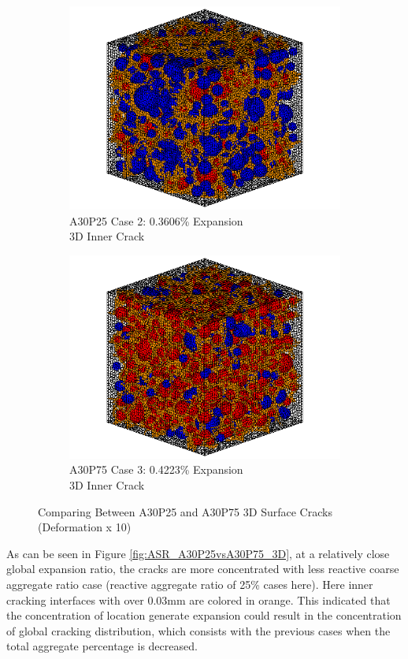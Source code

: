 \begin{figure}[ht!]
\centering

    \begin{subfigure}{.5\textwidth}
      \centering
      \includegraphics[width=.8\linewidth]{Files/exp_3D/ASR/A30P25_2_c.png}
    \caption{A30P25 Case 2: 0.3606\% Expansion \\ 3D Inner Crack}
    \end{subfigure}%
    \begin{subfigure}{.5\textwidth}
      \centering
      \includegraphics[width=.8\linewidth]{Files/exp_3D/ASR/A30P75_3_c.png}
    \caption{A30P75 Case 3: 0.4223\% Expansion\\ 3D Inner Crack}
    \end{subfigure}

  \caption{Comparing Between A30P25 and A30P75 3D Surface Cracks (Deformation x 10)}
  \label{fig:ASR_A30P25vsA30P75_3D_crack}
\end{figure}

As can be seen in Figure \ref{fig:ASR_A30P25vsA30P75_3D}, at a relatively close global expansion ratio, the cracks are more concentrated with less reactive coarse aggregate ratio case (reactive aggregate ratio of 25\% cases here). Here inner cracking interfaces with over 0.03mm are colored in orange. This indicated that the concentration of location generate expansion could result in the concentration of global cracking distribution, which consists with the previous cases when the total aggregate percentage is decreased.

